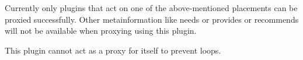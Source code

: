\begin{DoxyItemize}
\item Currently only plugins that act on one of the above-\/mentioned {\ttfamily placements} can be proxied successfully. Other metainformation like {\ttfamily needs} or {\ttfamily provides} or {\ttfamily recommends} will not be available when proxying using this plugin.
\item This plugin cannot act as a proxy for itself to prevent loops. 
\end{DoxyItemize}